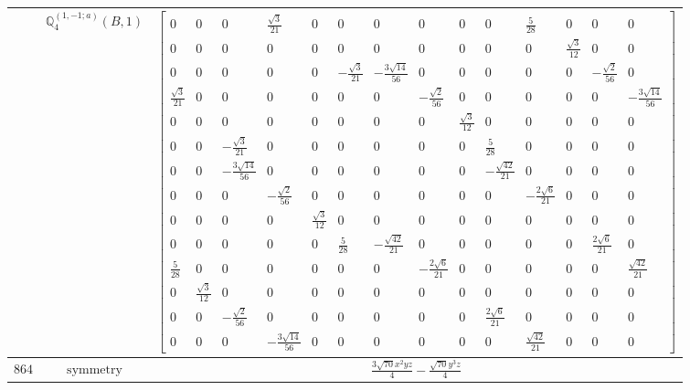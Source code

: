 \documentclass[fleqn,8pt,landscape]{jsarticle}
\begin{document}
\begin{longtable}{ccc}
$  $ & $ \mathbb{Q}_{4}^{(1,-1;a)}(B,1) $ & $ \begin{bmatrix} 0 & 0 & 0 & \frac{\sqrt{3}}{21} & 0 & 0 & 0 & 0 & 0 & 0 & \frac{5}{28} & 0 & 0 & 0 \\ 0 & 0 & 0 & 0 & 0 & 0 & 0 & 0 & 0 & 0 & 0 & \frac{\sqrt{3}}{12} & 0 & 0 \\ 0 & 0 & 0 & 0 & 0 & - \frac{\sqrt{3}}{21} & - \frac{3 \sqrt{14}}{56} & 0 & 0 & 0 & 0 & 0 & - \frac{\sqrt{2}}{56} & 0 \\ \frac{\sqrt{3}}{21} & 0 & 0 & 0 & 0 & 0 & 0 & - \frac{\sqrt{2}}{56} & 0 & 0 & 0 & 0 & 0 & - \frac{3 \sqrt{14}}{56} \\ 0 & 0 & 0 & 0 & 0 & 0 & 0 & 0 & \frac{\sqrt{3}}{12} & 0 & 0 & 0 & 0 & 0 \\ 0 & 0 & - \frac{\sqrt{3}}{21} & 0 & 0 & 0 & 0 & 0 & 0 & \frac{5}{28} & 0 & 0 & 0 & 0 \\ 0 & 0 & - \frac{3 \sqrt{14}}{56} & 0 & 0 & 0 & 0 & 0 & 0 & - \frac{\sqrt{42}}{21} & 0 & 0 & 0 & 0 \\ 0 & 0 & 0 & - \frac{\sqrt{2}}{56} & 0 & 0 & 0 & 0 & 0 & 0 & - \frac{2 \sqrt{6}}{21} & 0 & 0 & 0 \\ 0 & 0 & 0 & 0 & \frac{\sqrt{3}}{12} & 0 & 0 & 0 & 0 & 0 & 0 & 0 & 0 & 0 \\ 0 & 0 & 0 & 0 & 0 & \frac{5}{28} & - \frac{\sqrt{42}}{21} & 0 & 0 & 0 & 0 & 0 & \frac{2 \sqrt{6}}{21} & 0 \\ \frac{5}{28} & 0 & 0 & 0 & 0 & 0 & 0 & - \frac{2 \sqrt{6}}{21} & 0 & 0 & 0 & 0 & 0 & \frac{\sqrt{42}}{21} \\ 0 & \frac{\sqrt{3}}{12} & 0 & 0 & 0 & 0 & 0 & 0 & 0 & 0 & 0 & 0 & 0 & 0 \\ 0 & 0 & - \frac{\sqrt{2}}{56} & 0 & 0 & 0 & 0 & 0 & 0 & \frac{2 \sqrt{6}}{21} & 0 & 0 & 0 & 0 \\ 0 & 0 & 0 & - \frac{3 \sqrt{14}}{56} & 0 & 0 & 0 & 0 & 0 & 0 & \frac{\sqrt{42}}{21} & 0 & 0 & 0 \end{bmatrix} $ \\ \hline
$ 864 $ & $ \text{symmetry} $ & $ \frac{3 \sqrt{70} x^{2} y z}{4} - \frac{\sqrt{70} y^{3} z}{4} $ \\

\end{longtable}
\end{document}
